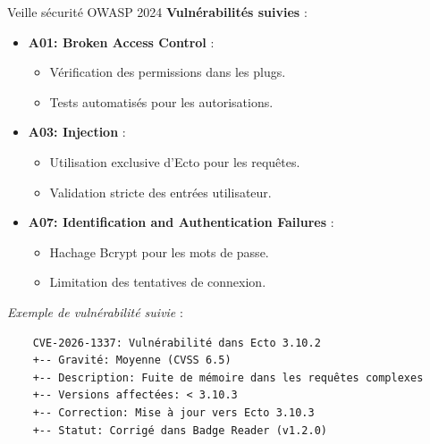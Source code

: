 \begin{for_you}{Veille sécurité OWASP 2024}
    \textbf{Vulnérabilités suivies} :
    \begin{itemize}
        \item \textbf{A01: Broken Access Control} :
              \begin{itemize}
                  \item Vérification des permissions dans les plugs.
                  \item Tests automatisés pour les autorisations.
              \end{itemize}
        \item \textbf{A03: Injection} :
              \begin{itemize}
                  \item Utilisation exclusive d’Ecto pour les requêtes.
                  \item Validation stricte des entrées utilisateur.
              \end{itemize}
        \item \textbf{A07: Identification and Authentication Failures} :
              \begin{itemize}
                  \item Hachage Bcrypt pour les mots de passe.
                  \item Limitation des tentatives de connexion.
                  \newline
              \end{itemize}
    \end{itemize}

    \textit{Exemple de vulnérabilité suivie} :
    \begin{verbatim}
    CVE-2026-1337: Vulnérabilité dans Ecto 3.10.2
    +-- Gravité: Moyenne (CVSS 6.5)
    +-- Description: Fuite de mémoire dans les requêtes complexes
    +-- Versions affectées: < 3.10.3
    +-- Correction: Mise à jour vers Ecto 3.10.3
    +-- Statut: Corrigé dans Badge Reader (v1.2.0)
    \end{verbatim}


\end{for_you}
